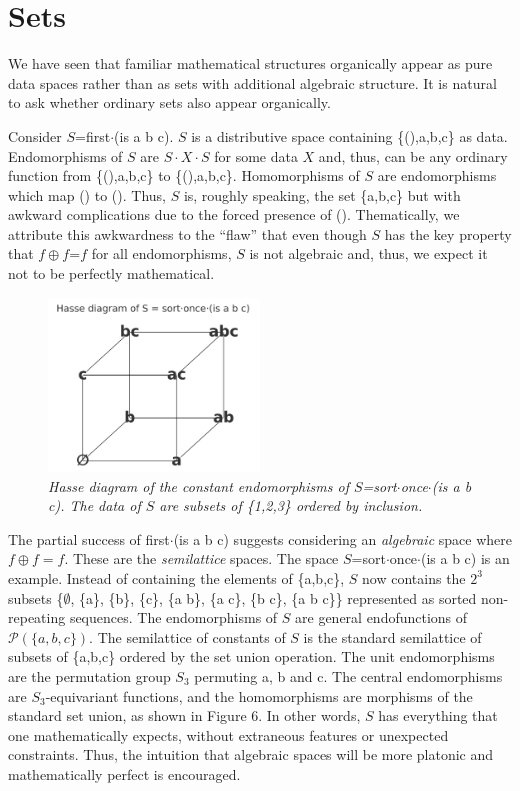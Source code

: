 \documentclass[11pt]{article}
\begin{document}
\section{Sets}

    We have seen that familiar mathematical structures organically appear as pure data spaces rather than as sets with additional algebraic structure.  
It is natural to ask whether ordinary sets also appear organically.  

     Consider $S$=first$\cdot$(is a b c).  $S$ is a distributive space containing \{(),a,b,c\} as data.  Endomorphisms of $S$ are  
$S\cdot X\cdot S$ for some data $X$ and, thus, can be any ordinary function from \{(),a,b,c\} to \{(),a,b,c\}.  Homomorphisms of $S$ 
are endomorphisms which map () to ().  Thus, $S$ is, roughly speaking, the set \{a,b,c\} but with awkward complications due 
to the forced presence of ().  Thematically, we attribute this awkwardness to the ``flaw'' that even though $S$ has the key property 
that $f\oplus f$=$f$ for all endomorphisms, $S$ is not algebraic and, thus, we expect it not to be perfectly mathematical.  

\begin{figure}[h]
\centering
\includegraphics[width=0.5\textwidth]{hasse.png}
\caption{{\it Hasse diagram of the constant endomorphisms of $S$=sort$\cdot$once$\cdot$(is a b c).  The data of $S$ are subsets 
of \{1,2,3\} ordered by inclusion.}}
\end{figure}

     The partial success of first$\cdot$(is a b c) suggests considering an {\it algebraic} space where $f\oplus f=f$.  
These are the {\it semilattice} spaces.  The space $S$=sort$\cdot$once$\cdot$(is a b c) is an example.  
Instead of containing the elements of \{a,b,c\}, $S$ now contains the $2^3$ subsets \{$\emptyset$, \{a\}, \{b\}, \{c\}, \{a b\}, \{a c\}, \{b c\}, \{a b c\}\} 
represented as sorted non-repeating sequences.  The endomorphisms of $S$ are general endofunctions of ${\mathcal P}(\{a,b,c\})$.  The semilattice of 
constants of $S$ is the standard semilattice of subsets of \{a,b,c\} ordered by the set union operation.  
The unit endomorphisms are the permutation group $S_3$ permuting a, b and c.  The central endomorphisms are $S_3$-equivariant functions, and the homomorphisms 
are morphisms of the standard set union, as shown in Figure 6.  In other words, $S$ has everything that one mathematically expects, without extraneous features or 
unexpected constraints.  Thus, the intuition that algebraic spaces will be more platonic and mathematically perfect is encouraged.  
\end{document}
